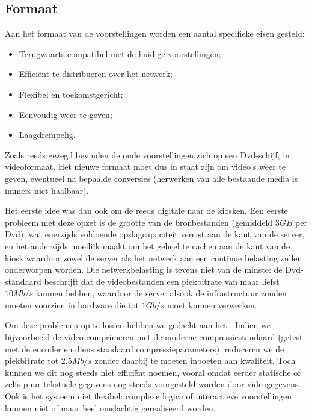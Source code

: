 \subsection{Formaat}

Aan het formaat van de voorstellingen worden een aantal specifieke eisen gesteld:
\begin{itemize}
\item Terugwaarts compatibel met de huidige voorstellingen;
\item Efficiënt te distribueren over het netwerk;
\item Flexibel en toekomstgericht;
\item Eenvoudig weer te geven;
\item Laagdrempelig.
\end{itemize}

Zoals reeds gezegd bevinden de oude voorstellingen zich op een Dvd-schijf, in videoformaat. Het nieuwe formaat moet dus in staat zijn om video's weer te geven, eventueel na bepaalde conversies (herwerken van alle bestaande media is immers niet haalbaar).

Het eerste idee was dan ook om de reeds digitale  naar de kiosken. Een eerste probleem met deze opzet is de grootte van de bronbestanden (gemiddeld $3 GB$ per Dvd), wat enerzijds voldoende opslagcapaciteit vereist aan de kant van de server, en het anderzijds moeilijk maakt om het geheel te cachen aan de kant van de kiosk waardoor zowel de server als het netwerk aan een continue belasting zullen onderworpen worden. Die netwerkbelasting is tevens niet van de minste: de Dvd-standaard beschrijft dat de videobestanden een piekbitrate van maar liefst $10 Mb/s$ kunnen hebben, waardoor de server alsook de infrastructuur zouden moeten voorzien in hardware die tot $1 Gb/s$ moet kunnen verwerken.

Om deze problemen op te lossen hebben we gedacht aan het . Indien we bijvoorbeeld de video comprimeren met de moderne  compressiestandaard (getest met de  encoder en diens standaard compressieparameters), reduceren we de piekbitrate tot $2.5 Mb/s$ zonder daarbij te moeten inboeten aan kwaliteit. Toch kunnen we dit nog steeds niet efficiënt noemen, vooral omdat eerder statische of zelfs puur tekstuele gegevens nog steeds voorgesteld worden door videogegevens. Ook is het systeem niet flexibel: complexe logica of interactieve voorstellingen kunnen niet of maar heel omslachtig gerealiseerd worden.


